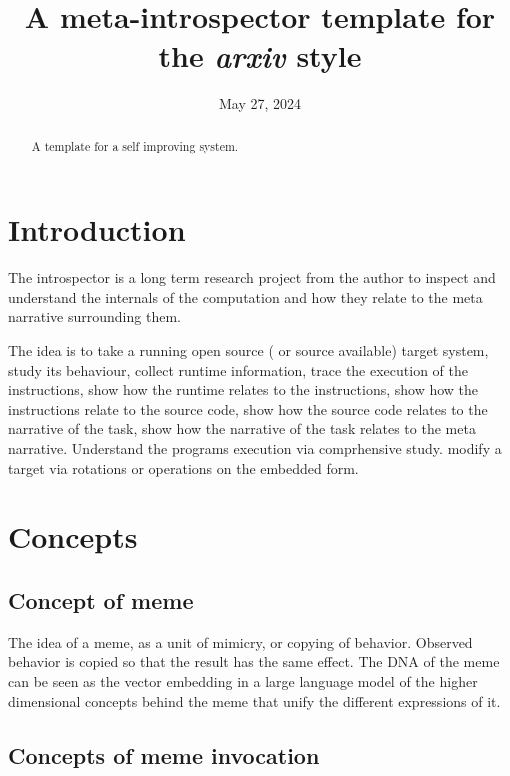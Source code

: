 \documentclass{article}
\title{A meta-introspector template for the \emph{arxiv} style}
\date{May 27, 2024}
\author{ \href{https://github.com/meta-introspector/time/blob/main/authors/james-michael-dupont.org}{\texttt{[image: metaintrospector-icon.png]}\hspace{1mm}Mike DuPont}\thanks
	Author\\
	Meta Introspector\\
	\texttt{jmikedupont2@gmail.com} \\
}
\author[1]{%
  \author{ \href{https://github.com/meta-introspector/time/blob/main/authors/james-michael-dupont.org}{\texttt{[image: metaintrospector-icon.png]}\hspace{1mm}Mike DuPont}\thanks\texttt{jmikedupont2@gmail.com}}}%
\affil[1]{Author, Meta Introspector}
\begin{document}
\maketitle

\begin{abstract}
	A template for a self improving system.
\end{abstract}



\section{Introduction}

The introspector is a long term research project from the author to inspect and understand the internals of the computation and how they relate to the meta narrative surrounding them.

The idea is to take a running open source ( or source available) target system,
study its behaviour, collect runtime information,
trace the execution of the instructions,
show how the runtime relates to the instructions,
show how the instructions relate to the source code,
show how the source code relates to the narrative of the task,
show how the narrative of the task relates to the meta narrative.
Understand the programs execution via comprhensive study.
modify a target via rotations or operations on the embedded form.

\section{Concepts}
\label{sec:concepts}

\subsection{Concept of meme}
The idea of a meme, as a unit of mimicry, or copying of behavior.
Observed behavior is copied so that the result has the same effect.
The DNA of the meme can be seen as the vector embedding in a large language model
of the higher dimensional concepts behind the meme that unify the different expressions of it.

\subsection{Concepts of meme invocation}
\end{document}
